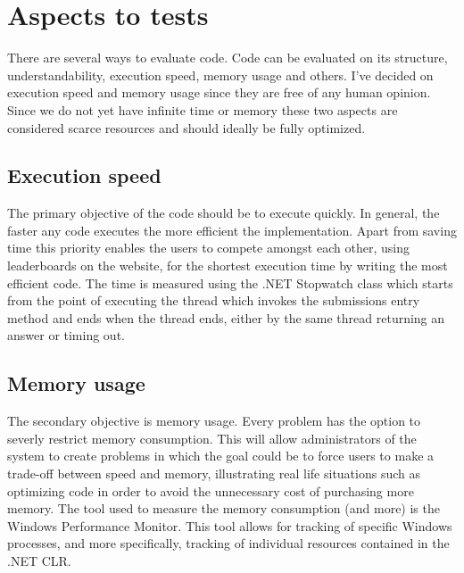 \section{Aspects to tests}
There are several ways to evaluate code. Code can be evaluated on its structure, understandability, execution speed, memory usage and others. I've decided on execution speed and memory usage since they are free of any human opinion. Since we do not yet have infinite time or memory these two aspects are considered scarce resources and should ideally be fully optimized.


\subsection{Execution speed}
The primary objective of the code should be to execute quickly. In general, the faster any code executes the more efficient the implementation. Apart from saving time this priority enables the users to compete amongst each other, using leaderboards on the website, for the shortest execution time by writing the most efficient code. 
The time is measured using the .NET Stopwatch class \cite{Stopwatch} which starts from the point of executing the thread which invokes the submissions entry method and ends when the thread ends, either by the same thread returning an answer or timing out. 


\subsection{Memory usage}
The secondary objective is memory usage. Every problem has the option to severly restrict memory consumption. This will allow administrators of the system to create problems in which the goal could be to force users to make a trade-off between speed and memory, illustrating real life situations such as optimizing code in order to avoid the unnecessary cost of purchasing more memory.
The tool used to measure the memory consumption (and more) is the Windows Performance Monitor. This tool allows for tracking of specific Windows processes, and more specifically, tracking of individual resources contained in the .NET CLR.
